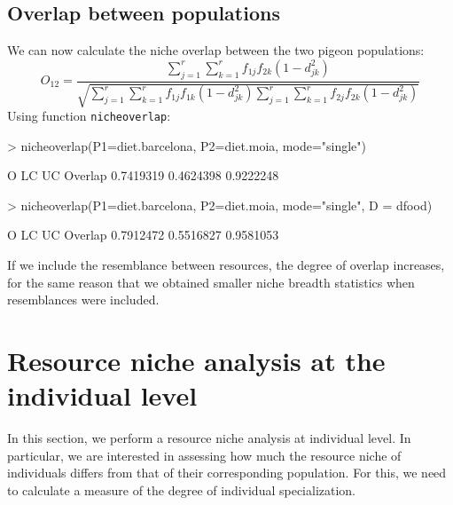 \documentclass[11pt,a4paper]{article}
\begin{document}
\subsection{Overlap between populations}
We can now calculate the niche overlap between the two pigeon populations:
\[
O_{12} = \frac{\sum_{j=1}^r\sum_{k=1}^r{f_{1j}f_{2k}(1-d_{jk}^2)}}{\sqrt{\sum_{j=1}^r\sum_{k=1}^r{f_{1j}f_{1k}(1-d_{jk}^2)}\sum_{j=1}^r\sum_{k=1}^r{f_{2j}f_{2k}(1-d_{jk}^2)}}}
\]
Using function \texttt{nicheoverlap}:
\begin{Schunk}
\begin{Sinput}
> nicheoverlap(P1=diet.barcelona, P2=diet.moia, mode="single")
\end{Sinput}
\begin{Soutput}
                O        LC        UC
Overlap 0.7419319 0.4624398 0.9222248
\end{Soutput}
\begin{Sinput}
> nicheoverlap(P1=diet.barcelona, P2=diet.moia, mode="single", D = dfood)
\end{Sinput}
\begin{Soutput}
                O        LC        UC
Overlap 0.7912472 0.5516827 0.9581053
\end{Soutput}
\end{Schunk}
If we include the resemblance between resources, the degree of overlap increases, for the same reason that we obtained smaller niche breadth statistics when resemblances were included.

\section{Resource niche analysis at the individual level}
In this section, we perform a resource niche analysis at individual level. In particular, we are interested in assessing how much the resource niche of individuals differs from that of their corresponding population. For this, we need to calculate a measure of the degree of individual specialization. 
\end{document}
